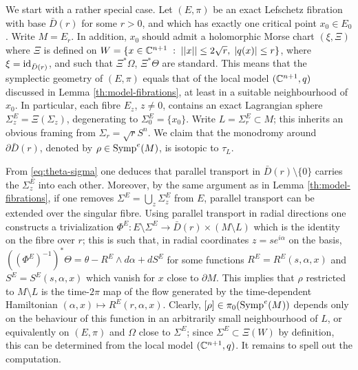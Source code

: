 \documentclass[10pt,letterpaper]{article}
\begin{document}
\proof We start with a rather special case. Let $(E,\pi)$ be an exact Lefschetz
fibration with base $\bar{D}(r)$ for some $r>0$, and which has exactly one
critical point $x_0 \in E_0$. Write $M = E_r$. In addition, $x_0$ should admit
a holomorphic Morse chart $(\xi,\Xi)$ where $\Xi$ is defined on $W = \{x \in
\mathbb{C}^{n+1} \; : \; ||x|| \leq 2\sqrt{r}, \; |q(x)| \leq r\}$, where $\xi =
\mathrm{id}_{\bar{D}(r)}$, and such that $\Xi^*\Omega$, $\Xi^*\Theta$ are standard.
This means that the symplectic geometry of $(E,\pi)$ equals that of the local
model $(\mathbb{C}^{n+1},q)$ discussed in Lemma \ref{th:model-fibrations}, at least in
a suitable neighbourhood of $x_0$. In particular, each fibre $E_z$, $z \neq 0$,
contains an exact Lagrangian sphere $\Sigma_z^E = \Xi(\Sigma_z)$, degenerating
to $\Sigma_0^E = \{x_0\}$. Write $L = \Sigma_r^E \subset M$; this inherits an
obvious framing from $\Sigma_r = \sqrt{r}S^n$. We claim that the monodromy
around $\partial \bar{D}(r)$, denoted by $\rho \in \mathrm{Symp}^e(M)$, is isotopic to
$\tau_L$.

From \eqref{eq:theta-sigma} one deduces that parallel transport in $\bar{D}(r)
\setminus \{0\}$ carries the $\Sigma_z^E$ into each other. Moreover, by the
same argument as in Lemma \ref{th:model-fibrations}, if one removes $\Sigma^E =
\bigcup_z \Sigma^E_z$ from $E$, parallel transport can be extended over the
singular fibre. Using parallel transport in radial directions one constructs a
trivialization $\Phi^E: E \setminus \Sigma^E \longrightarrow \bar{D}(r) \times
(M \setminus L)$ which is the identity on the fibre over $r$; this is such
that, in radial coordinates $z = se^{i\alpha}$ on the basis,
$((\Phi^E)^{-1})^*\Theta = \theta - R^E \wedge d\alpha + dS^E$ for some
functions $R^E = R^E(s,\alpha,x)$ and $S^E = S^E(s,\alpha,x)$ which vanish for
$x$ close to $\partial M$. This implies that $\rho$ restricted to $M \setminus
L$ is the time-$2\pi$ map of the flow generated by the time-dependent
Hamiltonian $(\alpha,x) \mapsto R^E(r,\alpha,x)$. Clearly, $[\rho] \in
\pi_0(\mathrm{Symp}^e(M))$ depends only on the behaviour of this function in an
arbitrarily small neighbourhood of $L$, or equivalently on $(E,\pi)$ and
$\Omega$ close to $\Sigma^E$; since $\Sigma^E \subset \Xi(W)$ by definition,
this can be determined from the local model $(\mathbb{C}^{n+1},q)$. It remains to spell
out the computation.
\end{document}
